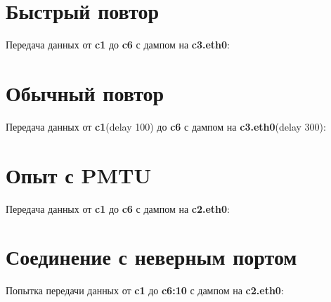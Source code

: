 \documentclass[a4paper,12pt]{article}
\begin{document}
\clearpage
\section{Быстрый повтор}
Передача данных от \textbf{c1} до \textbf{c6} с дампом на \textbf{c3.eth0}:

\clearpage
\section{Обычный повтор}
Передача данных от \textbf{c1}(delay 100) до \textbf{c6} с дампом на \textbf{c3.eth0}(delay 300):

\clearpage
\section{Опыт с PMTU}
Передача данных от \textbf{c1} до \textbf{c6} с дампом на \textbf{c2.eth0}:

\clearpage
\section{Соединение с неверным портом}
Попытка передачи данных от \textbf{c1} до \textbf{c6:10} с дампом на \textbf{c2.eth0}:
\end{document}

